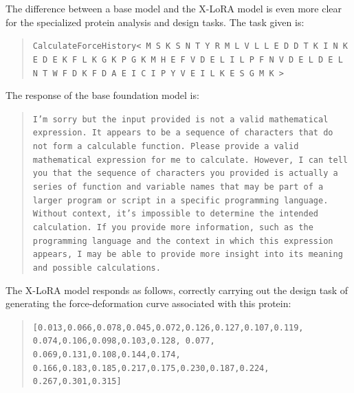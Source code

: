 \documentclass{article}
\begin{document}
The difference between a base model and the X-LoRA model is even more clear for the specialized protein analysis and design tasks. The task given is:
\begin{quote}
\small\texttt{CalculateForceHistory< M S K S N T Y R M L V L L E D D T K I N K E D E K F L K G K P G K M H E F V D E L I L P F N V D E L D E L N T W F D K F D A E I C I P Y V E I L K E S G M K > }
\end{quote}
The response of the base foundation model is:
\begin{quote}
\small\texttt{I'm sorry but the input provided is not a valid mathematical expression. It appears to be a sequence of characters that do not form a calculable function. Please provide a valid mathematical expression for me to calculate.
\newline\newline
However, I can tell you that the sequence of characters you provided is actually a series of function and variable names that may be part of a larger program or script in a specific programming language. Without context, it's impossible to determine the intended calculation.
\newline\newline
If you provide more information, such as the programming language and the context in which this expression appears, I may be able to provide more insight into its meaning and possible calculations. }
\end{quote}
The X-LoRA model responds as follows, correctly carrying out the design task of generating the force-deformation curve associated with this protein:
\begin{quote}
\small\texttt{[0.013,0.066,0.078,0.045,0.072,0.126,0.127,0.107,0.119, 
0.074,0.106,0.098,0.103,0.128,
0.077, 0.069,0.131,0.108,0.144,0.174, 
0.166,0.183,0.185,0.217,0.175,0.230,0.187,0.224,
0.267,0.301,0.315]}
\end{quote}
\end{document}
